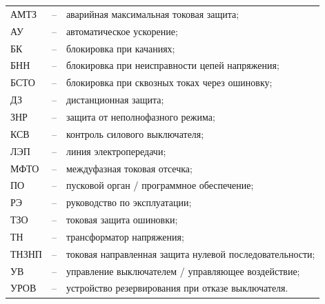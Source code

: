 \color{uniblue}\section*{}
\color{black}
\begin{longtable}{>{\raggedright\arraybackslash}m{2cm}>{\raggedright\arraybackslash}m{0.5cm}>{\raggedright\arraybackslash}m{20cm}}
\endfirsthead\endhead\endfoot\endlastfoot
АМТЗ & -- & аварийная максимальная токовая защита; \\
АУ & -- & автоматическое ускорение; \\
БК & -- & блокировка при качаниях; \\
БНН & -- & блокировка при неисправности цепей напряжения; \\
БСТО & -- & блокировка при сквозных токах через ошиновку; \\
ДЗ & -- & дистанционная защита; \\
ЗНР & -- & защита от неполнофазного режима; \\
КСВ & -- & контроль силового выключателя; \\
ЛЭП & -- & линия электропередачи; \\
МФТО & -- & междуфазная токовая отсечка; \\
ПО & -- & пусковой орган / программное обеспечение; \\
РЭ & -- & руководство по эксплуатации; \\
ТЗО & -- & токовая защита ошиновки; \\
ТН & -- & трансформатор напряжения; \\
ТНЗНП & -- & токовая направленная защита нулевой последовательности; \\
УВ & -- & управление выключателем / управляющее воздействие; \\
УРОВ & -- & устройство резервирования при отказе выключателя. \\
\end{longtable}
